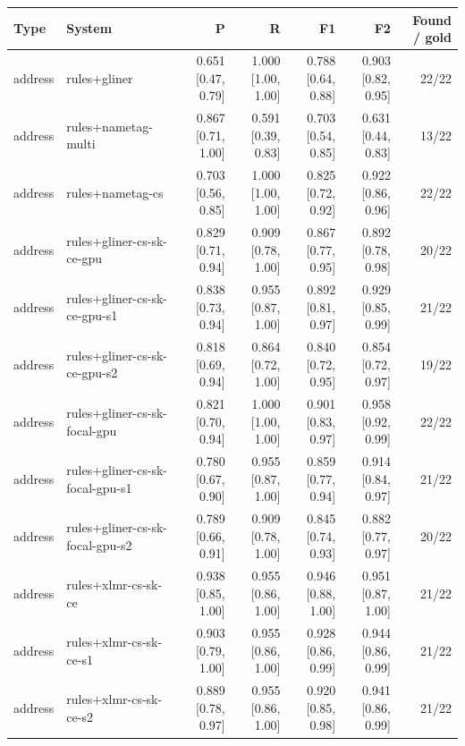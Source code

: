 \providecommand{\ci}[2]{{\scriptsize [#1, #2]}}

\begin{table}[htbp]
\centering
\small
\begin{tabular}{llrrrrr}
\toprule
Type & System & P & R & F1 & F2 & Found / gold \\
\midrule
address & rules+gliner & 0.651 \ci{0.47}{0.79} & 1.000 \ci{1.00}{1.00} & 0.788 \ci{0.64}{0.88} & 0.903 \ci{0.82}{0.95} & 22/22 \\
address & rules+nametag-multi & 0.867 \ci{0.71}{1.00} & 0.591 \ci{0.39}{0.83} & 0.703 \ci{0.54}{0.85} & 0.631 \ci{0.44}{0.83} & 13/22 \\
address & rules+nametag-cs & 0.703 \ci{0.56}{0.85} & 1.000 \ci{1.00}{1.00} & 0.825 \ci{0.72}{0.92} & 0.922 \ci{0.86}{0.96} & 22/22 \\
address & rules+gliner-cs-sk-ce-gpu & 0.829 \ci{0.71}{0.94} & 0.909 \ci{0.78}{1.00} & 0.867 \ci{0.77}{0.95} & 0.892 \ci{0.78}{0.98} & 20/22 \\
address & rules+gliner-cs-sk-ce-gpu-s1 & 0.838 \ci{0.73}{0.94} & 0.955 \ci{0.87}{1.00} & 0.892 \ci{0.81}{0.97} & 0.929 \ci{0.85}{0.99} & 21/22 \\
address & rules+gliner-cs-sk-ce-gpu-s2 & 0.818 \ci{0.69}{0.94} & 0.864 \ci{0.72}{1.00} & 0.840 \ci{0.72}{0.95} & 0.854 \ci{0.72}{0.97} & 19/22 \\
address & rules+gliner-cs-sk-focal-gpu & 0.821 \ci{0.70}{0.94} & 1.000 \ci{1.00}{1.00} & 0.901 \ci{0.83}{0.97} & 0.958 \ci{0.92}{0.99} & 22/22 \\
address & rules+gliner-cs-sk-focal-gpu-s1 & 0.780 \ci{0.67}{0.90} & 0.955 \ci{0.87}{1.00} & 0.859 \ci{0.77}{0.94} & 0.914 \ci{0.84}{0.97} & 21/22 \\
address & rules+gliner-cs-sk-focal-gpu-s2 & 0.789 \ci{0.66}{0.91} & 0.909 \ci{0.78}{1.00} & 0.845 \ci{0.74}{0.93} & 0.882 \ci{0.77}{0.97} & 20/22 \\
address & rules+xlmr-cs-sk-ce & 0.938 \ci{0.85}{1.00} & 0.955 \ci{0.86}{1.00} & 0.946 \ci{0.88}{1.00} & 0.951 \ci{0.87}{1.00} & 21/22 \\
address & rules+xlmr-cs-sk-ce-s1 & 0.903 \ci{0.79}{1.00} & 0.955 \ci{0.86}{1.00} & 0.928 \ci{0.86}{0.99} & 0.944 \ci{0.86}{0.99} & 21/22 \\
address & rules+xlmr-cs-sk-ce-s2 & 0.889 \ci{0.78}{0.97} & 0.955 \ci{0.86}{1.00} & 0.920 \ci{0.85}{0.98} & 0.941 \ci{0.86}{0.99} & 21/22 \\

\end{tabular}
\end{table}
